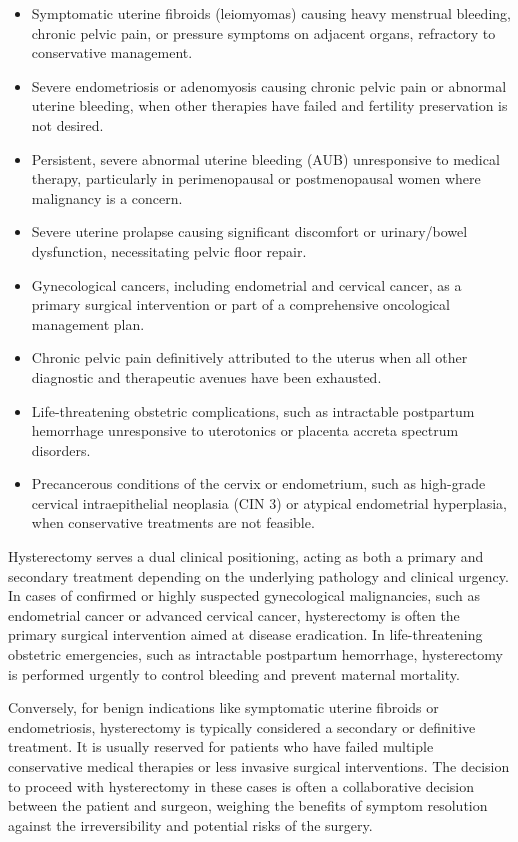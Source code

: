 \begin{itemize}
  \item Symptomatic uterine fibroids (leiomyomas) causing heavy menstrual bleeding, chronic pelvic pain, or pressure symptoms on adjacent organs, refractory to conservative management.
  \item Severe endometriosis or adenomyosis causing chronic pelvic pain or abnormal uterine bleeding, when other therapies have failed and fertility preservation is not desired.
  \item Persistent, severe abnormal uterine bleeding (AUB) unresponsive to medical therapy, particularly in perimenopausal or postmenopausal women where malignancy is a concern.
  \item Severe uterine prolapse causing significant discomfort or urinary/bowel dysfunction, necessitating pelvic floor repair.
  \item Gynecological cancers, including endometrial and cervical cancer, as a primary surgical intervention or part of a comprehensive oncological management plan.
  \item Chronic pelvic pain definitively attributed to the uterus when all other diagnostic and therapeutic avenues have been exhausted.
  \item Life-threatening obstetric complications, such as intractable postpartum hemorrhage unresponsive to uterotonics or placenta accreta spectrum disorders.
  \item Precancerous conditions of the cervix or endometrium, such as high-grade cervical intraepithelial neoplasia (CIN 3) or atypical endometrial hyperplasia, when conservative treatments are not feasible.
\end{itemize}

Hysterectomy serves a dual clinical positioning, acting as both a primary and secondary treatment depending on the underlying pathology and clinical urgency. In cases of confirmed or highly suspected gynecological malignancies, such as endometrial cancer or advanced cervical cancer, hysterectomy is often the primary surgical intervention aimed at disease eradication. In life-threatening obstetric emergencies, such as intractable postpartum hemorrhage, hysterectomy is performed urgently to control bleeding and prevent maternal mortality.

Conversely, for benign indications like symptomatic uterine fibroids or endometriosis, hysterectomy is typically considered a secondary or definitive treatment. It is usually reserved for patients who have failed multiple conservative medical therapies or less invasive surgical interventions. The decision to proceed with hysterectomy in these cases is often a collaborative decision between the patient and surgeon, weighing the benefits of symptom resolution against the irreversibility and potential risks of the surgery.

